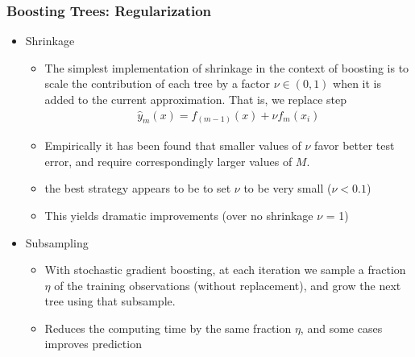 \documentclass[
  shownotes,
  xcolor={svgnames},
  hyperref={colorlinks,citecolor=DarkBlue,linkcolor=DarkRed,urlcolor=DarkBlue}
  , aspectratio=169]{beamer}
\begin{document}
\begin{frame}[fragile]
\frametitle{Boosting Trees: Regularization}
\begin{itemize}
\item Shrinkage
\begin{itemize}
  \item The simplest implementation of shrinkage in the context of boosting is to scale the contribution of each tree by a factor $\nu \in (0,1)$ when it is added to the current approximation. That is, we replace step 
  \begin{align}
   \hat{y}_m (x)=f_{(m-1)}(x) + \nu f_m(x_i)
  \end{align}
  \item Empirically it has been found  that smaller values of $\nu$ favor better test error, and require correspondingly larger values of $M$. 
  \item the best strategy appears to be to set $\nu$ to be very small ($\nu < 0.1$)
  \item This yields dramatic improvements (over no shrinkage $\nu$ = 1) 
\end{itemize} 
\item Subsampling
\begin{itemize}
\item With stochastic gradient boosting, at each iteration we sample a fraction $\eta$ of the training observations (without replacement), and grow the next tree using that subsample. 
\item Reduces the computing time by the same fraction $\eta$, and some cases improves prediction
\end{itemize}
\end{itemize}

\end{frame}
\end{document}
